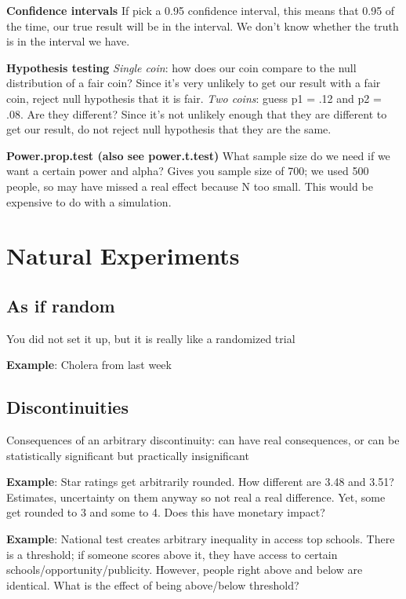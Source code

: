 \textbf{Confidence intervals} If pick a 0.95 confidence interval, this means that 0.95 of the time, our true result will be in the interval. We don't know whether the truth is in the interval we have.\newline

\textbf{Hypothesis testing} \textit{Single coin}: how does our coin compare to the null distribution of a fair coin? Since it's very unlikely to get our result with a fair coin, reject null hypothesis that it is fair. \textit{Two coins}: guess p1  = .12 and p2 = .08. Are they different? Since it's not unlikely enough that they are different to get our result, do not reject null hypothesis that they are the same. \newline

\textbf{Power.prop.test (also see power.t.test)} What sample size do we need if we want a certain power and alpha? Gives you sample size of 700; we used 500 people, so may have missed a real effect because N too small. This would be expensive to do with a simulation.

\section{Natural Experiments}
\subsection{As if random}
You did not set it up, but it is really like a randomized trial\newline

\textbf{Example}: Cholera from last week
\subsection{Discontinuities}
Consequences of an arbitrary discontinuity: can have real consequences, or can be statistically significant but practically insignificant \newline

\textbf{Example}: Star ratings get arbitrarily rounded. \newline How different are 3.48 and 3.51? Estimates, uncertainty on them anyway so not real a real difference. Yet, some get rounded to 3 and some to 4. Does this have monetary impact? \newline

\textbf{Example}: National test creates arbitrary inequality in access top schools. \newline
There is a threshold; if someone scores above it, they have access to certain schools/opportunity/publicity. However, people right above and below are identical. 
What is the effect of being above/below threshold?

